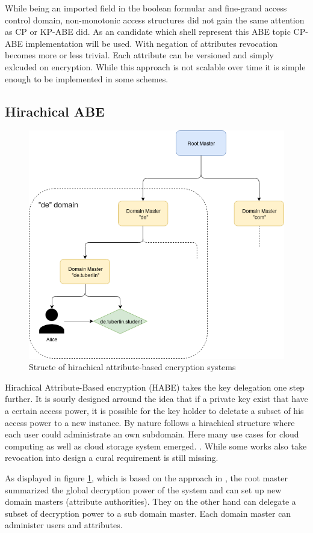 While being an imported field in the boolean formular and fine-grand access control domain, non-monotonic access structures did not gain the same attention as CP or KP-ABE did. As an candidate which shell represent this ABE topic \cite{10.1007/978-3-642-54631-0_16} CP-ABE implementation will be used. With negation of attributes revocation becomes more or less trivial. Each attribute can be versioned and simply exlcuded on encryption. While this approach is not scalable over time it is simple enough to be implemented in some schemes.   

\subsection{Hirachical ABE}

\begin{figure}[!ht]
\centering
    \includegraphics[width=0.5\linewidth]{img/HABE.png}
    \caption{Structe of hirachical attribute-based encryption systems}
    \label{fig:habe}
\end{figure}

Hirachical Attribute-Based encryption (HABE) takes the key delegation one step further. It is sourly designed arround the idea that if a private key exist that have a certain access power, it is possible for the key holder to deletate a subset of his access power to a new instance. By nature follows a hirachical structure where each user could administrate an own subdomain. Here many use cases for cloud computing as well as cloud storage system emerged. \cite{Wang:2010:HAE:1866307.1866414}. While some works also take revocation into design a cural requirement is still missing.

As displayed in figure \ref{fig:habe}, which is based on the approach in \cite{wang2011hierarchical}, the root master summarized the global decryption power of the system and can set up new domain masters (attribute authorities). They on the other hand can delegate a subset of decryption power to a sub domain master. Each domain master can administer users and attributes.

